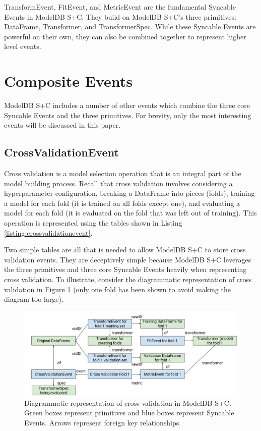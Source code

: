 TransformEvent, FitEvent, and MetricEvent are the fundamental Syncable Events in ModelDB S+C. They build on 
ModelDB S+C's three primitives: DataFrame, Transformer, and TransformerSpec. While these Syncable Events are powerful on
their own, they can also be combined together to represent higher level events.

\section{Composite Events}
ModelDB S+C includes a number of other events which combine the three core Syncable Events and the three primitives.
For brevity, only the most interesting events will be discussed in this paper.

\subsection{CrossValidationEvent}
Cross validation is a model selection operation that is an integral part of the
model building process. Recall that cross validation involves considering a hyperparameter
configuration, breaking a DataFrame into pieces (folds), training a model for each fold (it
is trained on all folds except one), and evaluating a model for each fold (it is evaluated on
the fold that was left out of training). This operation is represented using 
the tables shown in Listing \ref{listing:crossvalidationevent}.

Two simple tables are all that is needed to allow ModelDB S+C to store
cross validation events. They are deceptively simple because ModelDB S+C leverages
the three primitives and three core Syncable Events heavily when representing cross validation.
To illustrate, consider the diagrammatic representation of cross validation in Figure
\ref{fig:cross_validation_event} (only one fold has been shown to avoid making the diagram too large).

\begin{figure}
  \centering
  \includegraphics[width=5.0in]{cross_validation_event}
  \caption{
    Diagrammatic representation of cross validation in ModelDB S+C. Green boxes
    represent primitives and blue boxes represent Syncable Events. Arrows
    represent foreign key relationships.
  }
  \label{fig:cross_validation_event}
\end{figure}

